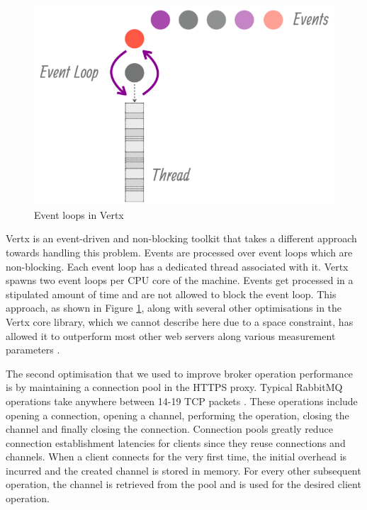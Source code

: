 \documentclass[conference, 10pt]{IEEEtran}
\begin{document}
\begin{figure}[H]
\includegraphics[width=\linewidth, height=\linewidth, keepaspectratio]{eventloop.png}
\caption{Event loops in Vertx\cite{eventloop}}
\label{eventloop}
\end{figure}

Vertx is an event-driven and non-blocking toolkit that takes a different approach towards handling this problem.  Events are processed over event loops which are non-blocking. Each event loop has a dedicated thread associated with it. Vertx spawns two event loops per CPU core of the machine. Events get processed in a stipulated amount of time and are not allowed to block the event loop. This approach, as shown in Figure \ref{eventloop}, along with several other optimisations in the Vertx core library, which we cannot describe here due to a space constraint, has allowed it to outperform most other web servers along various measurement parameters \cite{techempower}. 

The second optimisation that we used to improve broker operation performance is by maintaining a connection pool in the HTTPS proxy. Typical RabbitMQ operations take anywhere between 14-19 TCP packets \cite{cloudamqp}. These operations include opening a connection, opening a channel, performing the operation, closing the channel and finally closing the connection. Connection pools greatly reduce connection establishment latencies for clients since they reuse connections and channels. When a client connects for the very first time, the initial overhead is incurred and the created channel is stored in memory. For every other subsequent operation, the channel is retrieved from the pool and is used for the desired client operation.
\end{document}
